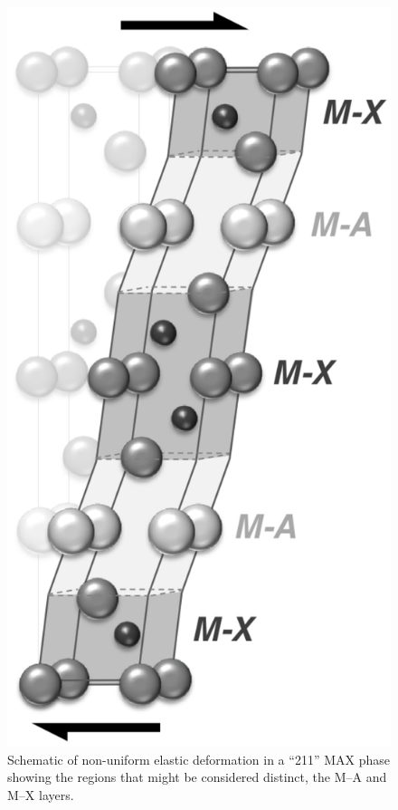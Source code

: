 \begin{figure}
\centering
\includegraphics[height=0.3\textheight]{slab_model}
\caption{Schematic of non-uniform elastic deformation in a ``211'' MAX phase showing the regions that might be considered distinct, the M--A and M--X layers.}
\end{figure}



